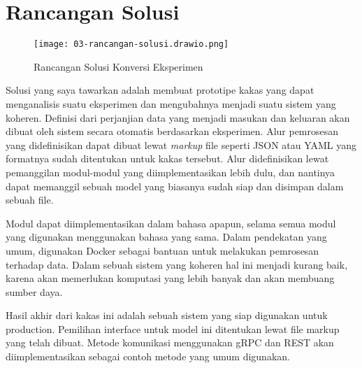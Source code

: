 \section{Rancangan Solusi}

\begin{figure}[ht]
  \centering
  \texttt{[image: 03-rancangan-solusi.drawio.png]}
  \caption{Rancangan Solusi Konversi Eksperimen}
\end{figure}

Solusi yang saya tawarkan adalah membuat prototipe kakas yang dapat menganalisis suatu eksperimen dan mengubahnya menjadi suatu sistem yang koheren.
Definisi dari perjanjian data yang menjadi masukan dan keluaran akan dibuat oleh sistem secara otomatis berdasarkan eksperimen.
Alur pemrosesan yang didefinisikan dapat dibuat lewat \textit{markup} file seperti JSON atau YAML yang formatnya sudah ditentukan untuk kakas tersebut.
Alur didefinisikan lewat pemanggilan modul-modul yang diimplementasikan lebih dulu, dan nantinya dapat memanggil sebuah model yang biasanya sudah siap dan disimpan dalam sebuah file.

Modul dapat diimplementasikan dalam bahasa apapun, selama semua modul yang digunakan menggunakan bahasa yang sama.
Dalam pendekatan yang umum, digunakan Docker sebagai bantuan untuk melakukan pemrosesan terhadap data.
Dalam sebuah sistem yang koheren hal ini menjadi kurang baik, karena akan memerlukan komputasi yang lebih banyak dan akan membuang sumber daya.

Hasil akhir dari kakas ini adalah sebuah sistem yang siap digunakan untuk production.
Pemilihan interface untuk model ini ditentukan lewat file markup yang telah dibuat.
Metode komunikasi menggunakan gRPC dan REST akan diimplementasikan sebagai contoh metode yang umum digunakan.

